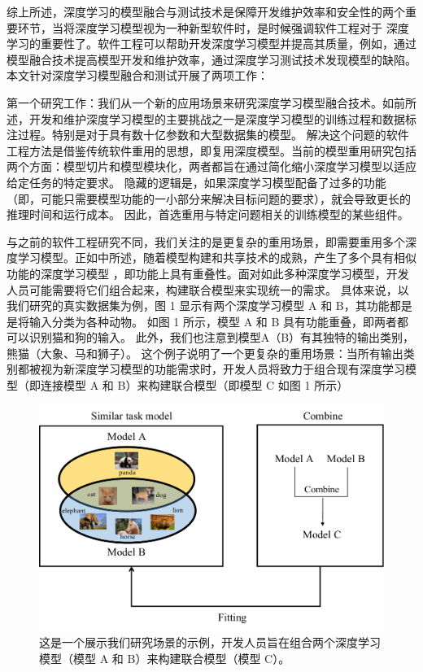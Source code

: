 \documentclass[fontset=macnew,UTF8]{article} %
\begin{document}
综上所述，深度学习的模型融合与测试技术是保障开发维护效率和安全性的两个重要环节，当将深度学习模型视为一种新型软件时，是时候强调软件工程对于 深度学习\cite{menzies2019five}的重要性了。软件工程可以帮助开发深度学习模型并提高其质量，例如，通过模型融合技术提高模型开发和维护效率，通过深度学习测试技术发现模型的缺陷。本文针对深度学习模型融合和测试开展了两项工作：

第一个研究工作：我们从一个新的应用场景来研究深度学习模型融合技术。如前所述，开发和维护深度学习模型的主要挑战之一是深度学习模型的训练过程和数据标注过程。特别是对于具有数十亿参数和大型数据集的模型\cite{li2021modeldiff,shen2020mcp}。 解决这个问题的软件工程方法是借鉴传统软件重用的思想\cite{poulin1996measuring}，即复用深度模型\cite{pan2022decomposing,meng2021measuring}。当前的模型重用研究包括两个方面：模型切片\cite{zhang2022remos}和模型模块化\cite{pan2020decomposing,qi2022patching}，两者都旨在通过简化缩小深度学习模型以适应给定任务的特定要求。 隐藏的逻辑是，如果深度学习模型配备了过多的功能（即，可能只需要模型功能的一小部分来解决目标问题的要求），就会导致更长的推理时间和运行成本。 因此，首选重用与特定问题相关的训练模型的某些组件\cite{qi2023reusing}。

与之前的软件工程研究不同，我们关注的是更复杂的重用场景，即需要重用多个深度学习模型。正如\cite{meng2021measuring}中所述，随着模型构建和共享技术的成熟，产生了多个具有相似功能的深度学习模型 ，即功能上具有重叠性。面对如此多种深度学习模型，开发人员可能需要将它们组合起来，构建联合模型来实现统一的需求。 具体来说，以我们研究的真实数据集为例，图 1 显示有两个深度学习模型 A 和 B，其功能都是是将输入分类为各种动物。 如图 1 所示，模型 A 和 B 具有功能重叠，即两者都可以识别猫和狗的输入。 此外，我们也注意到模型A（B）有其独特的输出类别，熊猫（大象、马和狮子）。 这个例子说明了一个更复杂的重用场景：当所有输出类别都被视为新深度学习模型的功能需求时，开发人员将致力于组合现有深度学习模型（即连接模型 A 和 B）来构建联合模型（即模型 C 如图 1 所示）

\begin{figure}[h]
	\centering
	\includegraphics[width=0.5\linewidth]{MCCP_scene.pdf}
	\caption{这是一个展示我们研究场景的示例，开发人员旨在组合两个深度学习模型（模型 A 和 B）来构建联合模型（模型 C）。}
	\label{MCCP}
\end{figure}
\end{document}
